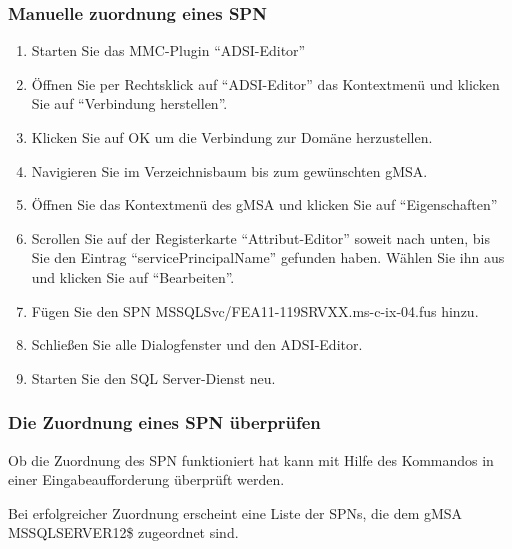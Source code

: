         \subsubsection{Manuelle zuordnung eines SPN}
          \begin{enumerate}
            \item Starten Sie das MMC-Plugin \enquote{ADSI-Editor}
            \item Öffnen Sie per Rechtsklick auf \enquote{ADSI-Editor} das
            Kontextmenü und klicken Sie auf \enquote{Verbindung herstellen}.
            \item Klicken Sie auf OK um die Verbindung zur Domäne herzustellen.
            \item Navigieren Sie im Verzeichnisbaum bis zum gewünschten gMSA.
            \item Öffnen Sie das Kontextmenü des gMSA und klicken Sie auf
            \enquote{Eigenschaften}
            \item Scrollen Sie auf der Registerkarte \enquote{Attribut-Editor}
            soweit nach unten, bis Sie den Eintrag
            \enquote{servicePrincipalName} gefunden haben. Wählen Sie ihn aus
            und klicken Sie auf \enquote{Bearbeiten}.
            \item Fügen Sie den SPN MSSQLSvc/FEA11-119SRVXX.ms-c-ix-04.fus
            hinzu.
            \item Schließen Sie alle Dialogfenster und den ADSI-Editor.
            \item Starten Sie den SQL Server-Dienst neu.
          \end{enumerate}
        \subsubsection{Die Zuordnung eines SPN überprüfen}
          Ob die Zuordnung des SPN funktioniert hat kann mit Hilfe des Kommandos
           in einer Eingabeaufforderung überprüft werden.
          
          
          Bei erfolgreicher Zuordnung erscheint eine Liste der SPNs, die dem
          gMSA MSSQLSERVER12\$ zugeordnet sind.
